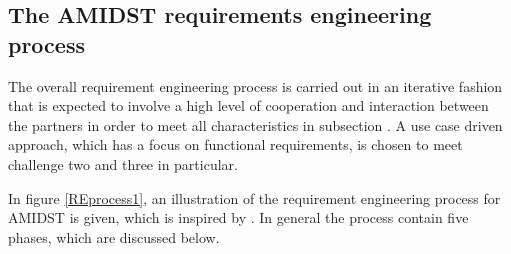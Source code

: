 \documentclass[11pt, oneside]{article}   	%
\begin{document}
\subsection{The AMIDST requirements engineering process}
\label{sec:reprocess}

The overall requirement engineering process is carried out in an iterative fashion that is expected to involve a high level of cooperation and interaction between the partners in order to meet all characteristics in subsection \label{sec:characteristics}.  A use case driven approach, which has a focus on functional requirements, is chosen to meet challenge two and three in particular.  

In figure \ref{REprocess1}, an illustration of the requirement engineering process for AMIDST is given, which is inspired by \cite{Ebe10}.  In general the process contain five phases, which are discussed below.
\end{document}
